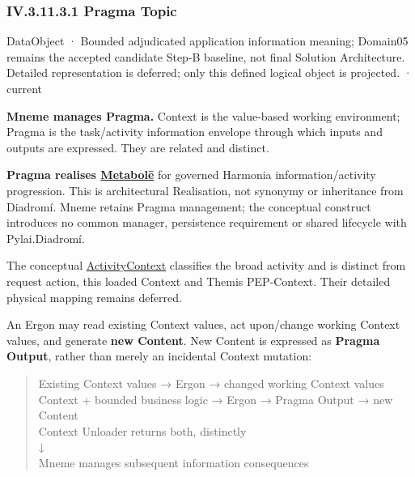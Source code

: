 \subsubsection*{IV.3.11.3.1 Pragma Topic}
\label{navigation:IV.3.11.3.1}

\label{element:27ad143e7c784e378556af8a57c438f7}
{\small DataObject · Bounded adjudicated application information meaning; Domain05 remains the accepted candidate Step-B baseline, not final Solution Architecture. Detailed representation is deferred; only this defined logical object is projected. · current}\par

\textbf{Mneme manages Pragma.} Context is the value-based working environment;
Pragma is the task/activity information envelope through which inputs and outputs
are expressed. They are related and distinct.



\textbf{Pragma realises \hyperref[element:c34b4929f71946708d37dbe6c1da920a]{Metabolē}}
for governed Harmonia information/activity progression. This is architectural
Realisation, not synonymy or inheritance from Diadromí. Mneme retains Pragma
management; the conceptual construct introduces no common manager, persistence
requirement or shared lifecycle with Pylai.Diadromí.



The conceptual
\hyperref[element:c34b4929f71946708d37dbe6c1da920a]{ActivityContext}
classifies the broad activity and is distinct from request action, this loaded
Context and Themis PEP-Context. Their detailed physical mapping remains deferred.



An Ergon may read existing Context values, act upon/change working Context
values, and generate \textbf{new Content}. New Content is expressed as \textbf{Pragma
Output}, rather than merely an incidental Context mutation:



\begin{quote}\small\ttfamily
Existing Context values → Ergon → changed working Context values\\
Context + bounded business logic → Ergon → Pragma Output → new Content\\
                  Context Unloader returns both, distinctly\\
                                    ↓\\
                 Mneme manages subsequent information consequences\\

\end{quote}


